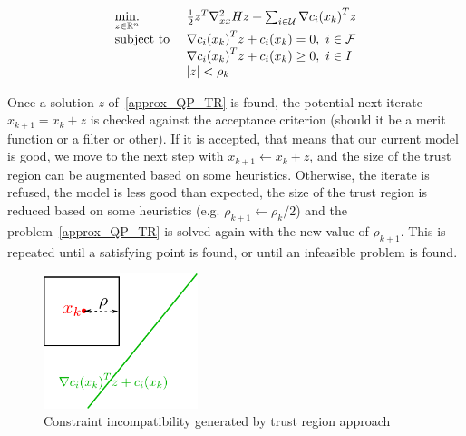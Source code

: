 \begin{equation}
  \begin{array}{ll}
    \operatorname*{min.}\limits_{z\in \mathbb{R}^n}{} & \frac{1}{2}z^T\nabla_{xx}^2Hz + \sum_{i\in\mathcal{U}}{\nabla c_i(x_k)}^T z \\
    \text{subject to } & {\nabla c_i(x_k)}^T z+c_i(x_k)=0,\ i\in \mathcal{F} \\
                       & {\nabla c_i(x_k)}^T z+c_i(x_k)\geq 0,\ i\in I\\
                       & |z|<\rho_k
  \end{array}
\label{approx_QP_TR}
\end{equation}

Once a solution $z$ of~\ref{approx_QP_TR} is found, the potential next iterate $x_{k+1} = x_k + z$ is checked against the acceptance criterion (should it be a merit function or a filter or other).
If it is accepted, that means that our current model is good, we move to the next step with $x_{k+1} \leftarrow x_k + z$, and the size of the trust region can be augmented based on some heuristics.
Otherwise, the iterate is refused, the model is less good than expected, the size of the trust region is reduced based on some heuristics (e.g. $\rho_{k+1}\leftarrow\rho_k /2$) and the problem~\ref{approx_QP_TR} is solved again with the new value of $\rho_{k+1}$.
This is repeated until a satisfying point is found, or until an infeasible problem is found.

\begin{figure}
  \centering
  \includegraphics[width=0.4\textwidth]{trust_region_incompatible.pdf}
  \caption{Constraint incompatibility generated by trust region approach}
\label{fig:TR_incompatible}
\end{figure}


